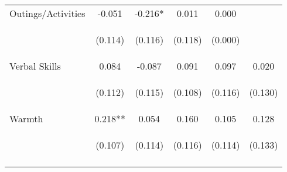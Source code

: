 \begin{tabular}{lccccc}
\noalign{\smallskip}Outings/Activities & -0.051 & -0.216* & 0.011 & 0.000 & \\
 & \begin{footnotesize}(0.114)\end{footnotesize} & \begin{footnotesize}(0.116)\end{footnotesize} & \begin{footnotesize}(0.118)\end{footnotesize} & \begin{footnotesize}(0.000)\end{footnotesize} & \begin{footnotesize}\end{footnotesize}\\
\noalign{\smallskip}Verbal Skills & 0.084 & -0.087 & 0.091 & 0.097 & 0.020\\
 & \begin{footnotesize}(0.112)\end{footnotesize} & \begin{footnotesize}(0.115)\end{footnotesize} & \begin{footnotesize}(0.108)\end{footnotesize} & \begin{footnotesize}(0.116)\end{footnotesize} & \begin{footnotesize}(0.130)\end{footnotesize}\\
\noalign{\smallskip}Warmth & 0.218** & 0.054 & 0.160 & 0.105 & 0.128\\
 & \begin{footnotesize}(0.107)\end{footnotesize} & \begin{footnotesize}(0.114)\end{footnotesize} & \begin{footnotesize}(0.116)\end{footnotesize} & \begin{footnotesize}(0.114)\end{footnotesize} & \begin{footnotesize}(0.133)\end{footnotesize}\\
\noalign{\smallskip}\hline\end{tabular}\\
